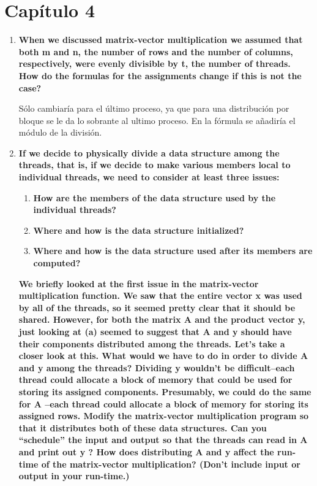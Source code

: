 \documentclass[a4paper,12pt]{article}
\begin{document}
\section{Capítulo 4}
\begin{enumerate}
\item \textbf{When we discussed matrix-vector multiplication we assumed that both m and n, the number 
of rows and the number of columns, respectively, were evenly divisible by t, the number of threads. 
How do the formulas for the assignments change if this is not the case?}
 
Sólo cambiaría para el último proceso, ya que para una distribución por bloque se le da lo sobrante al ultimo
proceso. En la fórmula se añadiría el módulo de la división.

\item{ \textbf{If we decide to physically divide a data structure among the threads, that is, if we decide
to make various members local to individual threads, we need to consider at least three issues:}
\begin{enumerate}
 \item \textbf{How are the members of the data structure used by the individual threads?}
 \item \textbf{Where and how is the data structure initialized?}
 \item \textbf{Where and how is the data structure used after its members are computed?}
\end{enumerate}
\textbf{We briefly looked at the first issue in the matrix-vector multiplication function. We saw that the
entire vector x was used by all of the threads, so it seemed pretty clear that it should be shared.
However, for both the matrix A and the product vector y, just looking at (a) seemed to suggest that
A and y should have their components distributed among the threads. Let’s take a closer look at this.
What would we have to do in order to divide A and y among the threads? Dividing y wouldn’t be difficult–each
thread could allocate a block of memory that could be used for storing its assigned components. Presumably,
we could do the same for A –each thread could allocate a block of memory for storing its assigned rows. 
Modify the matrix-vector multiplication program so that it distributes both of these data structures. 
Can you ``schedule'' the input and output so that the threads can read in A and print out y ? How does
distributing A and y affect the run-time of the matrix-vector multiplication? (Don’t include
input or output in your run-time.)}
}


\end{enumerate}
\end{document}
